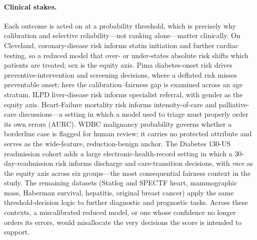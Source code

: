 \documentclass[fleqn,10pt]{wlscirep}
\begin{document}
\paragraph{Clinical stakes.} Each outcome is acted on at a probability threshold, which is precisely
why calibration and selective reliability---not ranking alone---matter clinically. On Cleveland,
coronary-disease risk informs statin initiation and further cardiac testing, so a reduced model that
over- or under-states absolute risk shifts which patients are treated; sex is the equity axis. Pima
diabetes-onset risk drives preventive-intervention and screening decisions, where a deflated risk
misses preventable onset; here the calibration--fairness gap is examined across an age stratum. ILPD
liver-disease risk informs specialist referral, with gender as the equity axis. Heart-Failure
mortality risk informs intensity-of-care and palliative-care discussions---a setting in which a model
used to triage must properly order its own errors (AURC). WDBC malignancy probability governs whether a
borderline case is flagged for human review; it carries no protected attribute and serves as the
wide-feature, reduction-benign anchor. The Diabetes 130-US readmission cohort adds a large
electronic-health-record setting in which a 30-day-readmission risk informs discharge and
care-transition decisions, with \emph{race} as the equity axis across six groups---the most
consequential fairness context in the study. The remaining datasets (Statlog and SPECTF heart,
mammographic mass, Haberman survival, hepatitis, original breast cancer) apply the same
threshold-decision logic to further diagnostic and prognostic tasks. Across these contexts, a
miscalibrated reduced model, or one whose confidence no longer orders its errors, would misallocate
the very decisions the score is intended to support.
\end{document}
